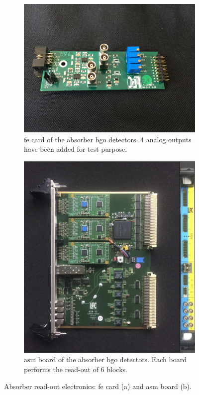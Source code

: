 \begin{figure}
\begin{subfigure}[htbp]{0.5\textwidth}
\centering
\includegraphics[width=\linewidth, angle = -90]{03_GraphicFiles/chapter3_CLaRySproto/Absorber/images/FEcard}
\caption{\gls{fe} card of the absorber \gls{bgo} detectors. 4 analog outputs have been added for test purpose.}
\label{chap3::fig::FEcard} 
\end{subfigure}
\begin{subfigure}[htbp]{0.5\textwidth}
\centering
\includegraphics[width=0.89\linewidth,]{03_GraphicFiles/chapter3_CLaRySproto/Absorber/ASMcard.jpg}
\caption{\gls{asm} board of the absorber \gls{bgo} detectors. Each board performs the read-out of 6 blocks.}
\label{chap3::fig::ASMcard} 
\end{subfigure}
\caption{Absorber read-out electronics: \gls{fe} card (a) and \gls{asm} board (b).}
\label{chap5::fig::AbsorberCards}
\end{figure}

